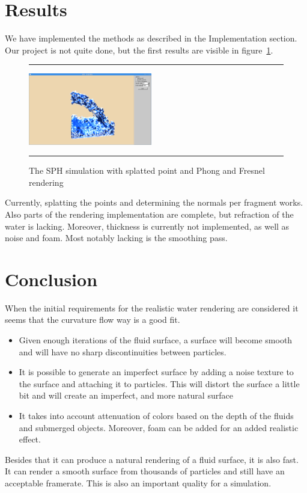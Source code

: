 \section{Results}
We have implemented the methods as described in the Implementation section.
Our project is not quite done, but the first results are visible in figure~\ref{fig:res}.

\begin{figure}[!th]
\hrule
\begin{center}
\vspace*{2ex}\includegraphics[width=0.48\textwidth,clip=true,trim=10cm 3cm 10cm 3cm]{pictures/colors.png}
\end{center}
\caption{The SPH simulation with splatted point and Phong and Fresnel rendering}
\label{fig:res} 
\vspace*{2ex}
\hrule
\end{figure}

Currently, splatting the points and determining the normals per fragment works. Also parts of the rendering implementation are complete, but refraction of the water is lacking.
Moreover, thickness is currently not implemented, as well as noise and foam.
Most notably lacking is the smoothing pass. 

\section{Conclusion}
When the initial requirements for the realistic water rendering are considered it seems that the curvature flow way is a good fit.
\begin{itemize}
\item Given enough iterations of the fluid surface, a surface will become smooth and will have no sharp discontinuities between particles.
\item It is possible to generate an imperfect surface by adding a noise texture to the surface and attaching it to particles. This will distort the surface a little bit and will create an imperfect, and more natural surface
\item It takes into account attenuation of colors based on the depth of the fluids and submerged objects. Moreover, foam can be added for an added realistic effect.
\end{itemize}
Besides that it can produce a natural rendering of a fluid surface, it is also fast. 
It can render a smooth surface from thousands of particles and still have an acceptable framerate. 
This is also an important quality for a simulation.
